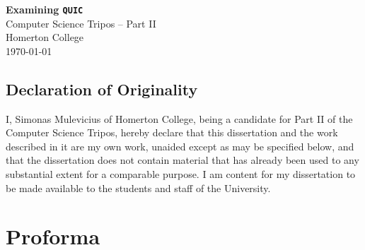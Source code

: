 \documentclass[12pt,a4paper,twoside,openright]{report}
\begin{document}





\pagestyle{empty}


\vspace*{60mm}
\begin{center}
\Huge
\textbf{Examining \texttt{QUIC}} \\[5mm]
Computer Science Tripos -- Part II \\[5mm]
Homerton College \\[5mm]
\today  %
\end{center}








\newpage



\section*{Declaration of Originality}

I, Simonas Mulevicius of Homerton College, being a candidate for Part II of the Computer
Science Tripos, hereby declare
that this dissertation and the work described in it are my own work,
unaided except as may be specified below, and that the dissertation
does not contain material that has already been used to any substantial
extent for a comparable purpose. I am content for my dissertation to
be made available to the students and staff of the University.

\bigskip
{}

\medskip
{}


\newpage











\pagestyle{plain}

\chapter*{Proforma}
\end{document}
